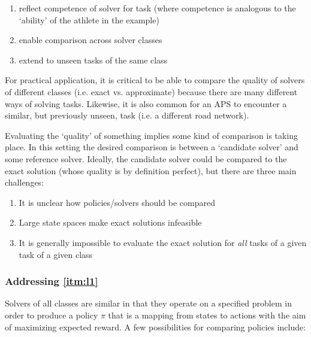     \begin{enumerate}[label=\textbf{D\arabic*}]
        \item reflect competence of solver \solve{} for task \task{} (where competence is analogous to the `ability' of the athlete in the example)\label{itm:d1}
        \item enable comparison across solver classes \label{itm:d2}
        \item extend to unseen tasks of the same class \taskclass \label{itm:d3}
    \end{enumerate}
    
    For practical application, it is critical to be able to compare the quality of solvers of different classes (i.e. exact vs. approximate) because there are many different ways of solving tasks. Likewise, it is also common for an APS to encounter a similar, but previously unseen, task (i.e. a different road network).
    
    Evaluating the `quality' of something implies some kind of comparison is taking place. In this setting the desired comparison is between a `candidate solver' \solve{} and some reference solver. Ideally, the candidate solver could be compared to the exact solution (whose quality is by definition perfect), but there are three main challenges:

    \begin{enumerate}[label=\textbf{C\arabic*}]
        \item It is unclear how policies/solvers should be compared \label{itm:l1}
        \item Large state spaces make exact solutions infeasible \label{itm:l2}
        \item It is generally impossible to evaluate the exact solution for \emph{all} tasks of a given task \label{itm:l3} of a given class
    \end{enumerate}

    \subsubsection{Addressing \ref{itm:l1}} \label{sec:compare_policies}
        Solvers of all classes are similar in that they operate on a specified problem in order to produce a policy $\pi$ that is a mapping from states to actions with the aim of maximizing expected reward. A few possibilities for comparing policies include:
    
